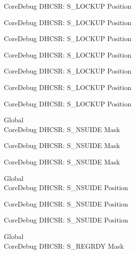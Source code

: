 \begin{DoxyRefList}
\label{deprecated__deprecated000113}%
%
Core\+Debug DHCSR\+: S\+\_\+\+LOCKUP Position 

\label{deprecated__deprecated000167}%
%
Core\+Debug DHCSR\+: S\+\_\+\+LOCKUP Position 

\label{deprecated__deprecated000252}%
%
Core\+Debug DHCSR\+: S\+\_\+\+LOCKUP Position 

\label{deprecated__deprecated000309}%
%
Core\+Debug DHCSR\+: S\+\_\+\+LOCKUP Position 

\label{deprecated__deprecated000385}%
%
Core\+Debug DHCSR\+: S\+\_\+\+LOCKUP Position 

\label{deprecated__deprecated000472}%
%
Core\+Debug DHCSR\+: S\+\_\+\+LOCKUP Position 

\label{deprecated__deprecated000574}%
%
Core\+Debug DHCSR\+: S\+\_\+\+LOCKUP Position  
\item[Global \doxylink{group___c_m_s_i_s___s_c_b_gabe0164afd9f6b8800fb7e05280e0ecda}{Core\+Debug\+\_\+\+DHCSR\+\_\+\+S\+\_\+\+NSUIDE\+\_\+\+Msk} ]\hfill \\
\label{deprecated__deprecated000018}%
%
Core\+Debug DHCSR\+: S\+\_\+\+NSUIDE Mask 

\label{deprecated__deprecated000469}%
%
Core\+Debug DHCSR\+: S\+\_\+\+NSUIDE Mask 

\label{deprecated__deprecated000571}%
%
Core\+Debug DHCSR\+: S\+\_\+\+NSUIDE Mask  
\item[Global \doxylink{group___c_m_s_i_s___s_c_b_ga59e228c682eec72e892b2ce018afe477}{Core\+Debug\+\_\+\+DHCSR\+\_\+\+S\+\_\+\+NSUIDE\+\_\+\+Pos} ]\hfill \\
\label{deprecated__deprecated000017}%
%
Core\+Debug DHCSR\+: S\+\_\+\+NSUIDE Position 

\label{deprecated__deprecated000468}%
%
Core\+Debug DHCSR\+: S\+\_\+\+NSUIDE Position 

\label{deprecated__deprecated000570}%
%
Core\+Debug DHCSR\+: S\+\_\+\+NSUIDE Position  
\item[Global \doxylink{group___c_m_s_i_s___core_debug_gac4cd6f3178de48f473d8903e8c847c07}{Core\+Debug\+\_\+\+DHCSR\+\_\+\+S\+\_\+\+REGRDY\+\_\+\+Msk} ]\hfill \\
\label{deprecated__deprecated000028}%
%
Core\+Debug DHCSR\+: S\+\_\+\+REGRDY Mask 


\end{DoxyRefList}
